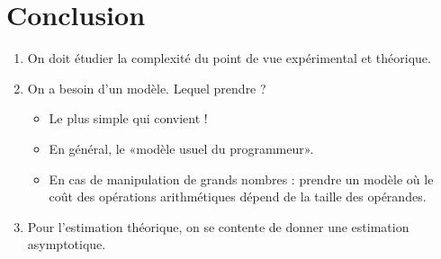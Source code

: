 \section{Conclusion}

\begin{enumerate}
\item On doit étudier la complexité du point de vue expérimental et théorique.
\item On a besoin d'un modèle. Lequel prendre ?
  \begin{itemize}
  \item Le plus simple qui convient !
  \item En général, le «modèle usuel du programmeur».
  \item En cas de manipulation de grands nombres : prendre un modèle où le coût
    des opérations arithmétiques dépend de la taille des opérandes.
  \end{itemize}
\item Pour l'estimation théorique, on se contente de donner une
  estimation asymptotique.
\end{enumerate}